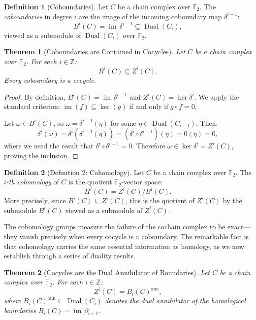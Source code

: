 \documentclass[11pt]{article}
\theoremstyle{plain}
\newtheorem*{theorem}{Theorem}
\theoremstyle{definition}
\newtheorem*{definition}{Definition}
\theoremstyle{remark}
\renewcommand{\ker}{\operatorname{ker}}
\begin{document}
\begin{definition}[Coboundaries]
Let $C$ be a chain complex over $\mathbb{F}_2$. The \emph{coboundaries} in degree $i$ are the image of the incoming coboundary map $\delta^{i-1}$:
\[
  B^i(C) = \operatorname{im}\,\delta^{i-1} \subseteq \operatorname{Dual}(C_i),
\]
viewed as a submodule of $\operatorname{Dual}(C_i)$ over $\mathbb{F}_2$.
\end{definition}

\begin{theorem}[Coboundaries are Contained in Cocycles]
Let $C$ be a chain complex over $\mathbb{F}_2$. For each $i \in \mathbb{Z}$:
\[
  B^i(C) \subseteq Z^i(C).
\]
Every coboundary is a cocycle.
\end{theorem}

\begin{proof}
By definition, $B^i(C) = \operatorname{im}\,\delta^{i-1}$ and $Z^i(C) = \ker \delta^i$. We apply the standard criterion: $\operatorname{im}(f) \subseteq \ker(g)$ if and only if $g \circ f = 0$. 

Let $\omega \in B^i(C)$, so $\omega = \delta^{i-1}(\eta)$ for some $\eta \in \operatorname{Dual}(C_{i-1})$. Then:
\[
\delta^i(\omega) = \delta^i(\delta^{i-1}(\eta)) = (\delta^i \circ \delta^{i-1})(\eta) = 0(\eta) = 0,
\]
where we used the result that $\delta^i \circ \delta^{i-1} = 0$. Therefore $\omega \in \ker \delta^i = Z^i(C)$, proving the inclusion.
\end{proof}

\begin{definition}[Definition 2: Cohomology]
Let $C$ be a chain complex over $\mathbb{F}_2$. The \emph{$i$-th cohomology} of $C$ is the quotient $\mathbb{F}_2$-vector space:
\[
  H^i(C) = Z^i(C) / B^i(C).
\]
More precisely, since $B^i(C) \subseteq Z^i(C)$, this is the quotient of $Z^i(C)$ by the submodule $B^i(C)$ viewed as a submodule of $Z^i(C)$.
\end{definition}

The cohomology groups measure the failure of the cochain complex to be exact—they vanish precisely when every cocycle is a coboundary. The remarkable fact is that cohomology carries the same essential information as homology, as we now establish through a series of duality results.

\begin{theorem}[Cocycles are the Dual Annihilator of Boundaries]
Let $C$ be a chain complex over $\mathbb{F}_2$. For each $i \in \mathbb{Z}$:
\[
  Z^i(C) = B_i(C)^{\mathrm{ann}},
\]
where $B_i(C)^{\mathrm{ann}} \subseteq \operatorname{Dual}(C_i)$ denotes the dual annihilator of the homological boundaries $B_i(C) = \operatorname{im}\,\partial_{i+1}$.
\end{theorem}
\end{document}
